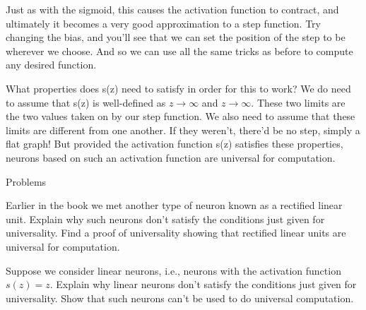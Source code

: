 \documentclass[a4paper,twoside,10pt]{book}
\begin{document}

\noindent Just as with the sigmoid, this causes the activation function to contract, and ultimately it becomes a very good approximation to a step function. Try changing the bias, and you'll see that we can set the position of the step to be wherever we choose. And so we can use all the same tricks as before to compute any desired function.

What properties does s(z) need to satisfy in order for this to work? We do need to assume that s(z) is well-defined as $z\to\infty$ and $z\to\infty$. These two limits are the two values taken on by our step function. We also need to assume that these limits are different from one another. If they weren't, there'd be no step, simply a flat graph! But provided the activation function s(z) satisfies these properties, neurons based on such an activation function are universal for computation.

\begin{exercize}{Problems}
\item Earlier in the book we met another type of neuron known as a rectified linear unit. Explain why such neurons don't satisfy the conditions just given for universality. Find a proof of universality showing that rectified linear units are universal for computation.
\item Suppose we consider linear neurons, i.e., neurons with the activation function $s(z)=z$. Explain why linear neurons don't satisfy the conditions just given for universality. Show that such neurons can't be used to do universal computation.
\end{exercize}
\end{document}
